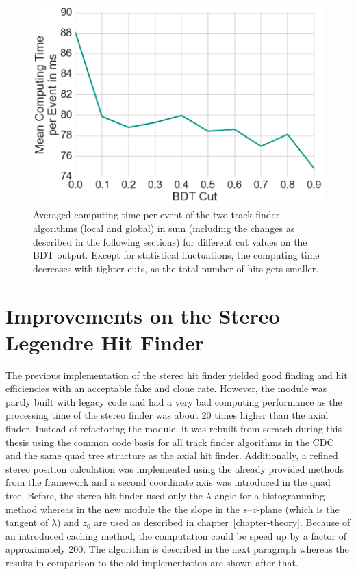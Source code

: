 \begin{figure}
  \centering
  \includegraphics[width=0.7\linewidth]{figures/workflow/background_hit_finder_performance.png}
  \caption{Averaged computing time per event of the two track finder algorithms (local and global) in sum (including the changes as described in the following sections) for different cut values on the BDT output. Except for statistical fluctuations, the computing time decreases with tighter cuts, as the total number of hits gets smaller.}
  \label{fig-performance-clusters}
\end{figure}

\section{Improvements on the Stereo Legendre Hit Finder} \label{section-stereo}

The previous implementation of the stereo hit finder yielded good finding and hit efficiencies with an acceptable fake and clone rate. However, the module was partly built with legacy code and had a very bad computing performance as the processing time of the stereo finder was about 20 times higher than the axial finder. Instead of refactoring the module, it was rebuilt from scratch during this thesis using the common code basis for all track finder algorithms in the CDC and the same quad tree structure as the axial hit finder. Additionally, a refined stereo position calculation was implemented using the already provided methods from the framework and a second coordinate axis was introduced in the quad tree. Before, the stereo hit finder used only the $\lambda$ angle for a histogramming method whereas in the new module the the slope in the $s$--$z$-plane (which is the tangent of $\lambda$) and $z_0$ are used as described in chapter~\ref{chapter-theory}. Because of an introduced caching method, the computation could be speed up by a factor of approximately 200. The algorithm is described in the next paragraph whereas the results in comparison to the old implementation are shown after that.

